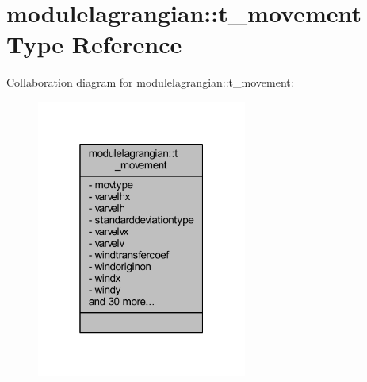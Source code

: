 \hypertarget{structmodulelagrangian_1_1t__movement}{}\section{modulelagrangian\+:\+:t\+\_\+movement Type Reference}
\label{structmodulelagrangian_1_1t__movement}


Collaboration diagram for modulelagrangian\+:\+:t\+\_\+movement\+:\nopagebreak
\begin{figure}[H]
\begin{center}
\leavevmode
\includegraphics[width=196pt]{structmodulelagrangian_1_1t__movement__coll__graph}
\end{center}
\end{figure}
